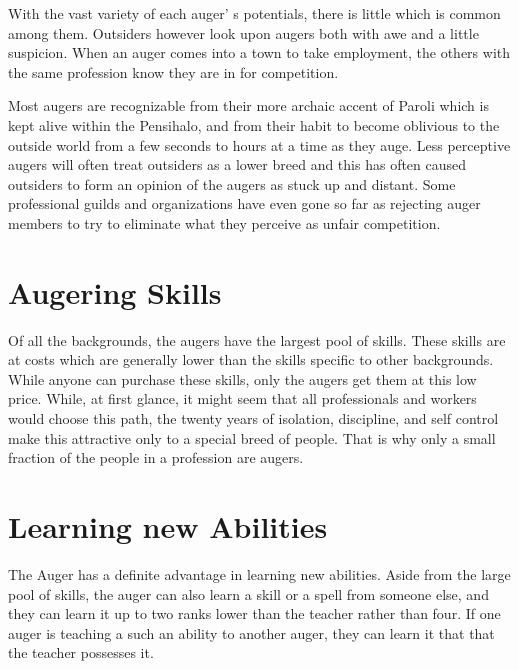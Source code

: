 \begin{multicols*}{2}
With the vast variety of each auger' s potentials, there is little which is common among them. Outsiders however look upon augers both with awe and a little suspicion. When an auger comes into a town to take employment, the others with the same profession know they are in for competition.

Most augers are recognizable from their more archaic accent of Paroli which is kept alive within the  Pensihalo, and from their habit to become oblivious to the outside world from a few seconds to hours at a time as they auge. Less perceptive augers will often treat outsiders as a lower breed and this has often caused outsiders to form an opinion of the augers as stuck up and distant. Some professional guilds and organizations have even gone so far as rejecting auger members to try to eliminate what they perceive as unfair competition.

\section{Augering Skills}

Of all the backgrounds, the augers have the largest pool of skills. These skills are at costs which are generally lower than the skills specific to other backgrounds. While anyone can purchase these skills, only the augers get them at this low price. While, at first glance, it might seem that all professionals and workers would choose this path, the twenty years of isolation, discipline, and self control make this attractive only to a special breed of people. That is why only a small fraction of the people in a profession are augers.

\section{Learning new Abilities}

The Auger has a definite advantage in learning new abilities. Aside from the large pool of skills, the auger can also learn a skill or a spell from someone else, and they can learn it up to two ranks lower than the teacher rather than four. If one auger is teaching a such an ability to another auger, they can learn it  that that the teacher possesses it.

\end{multicols*}